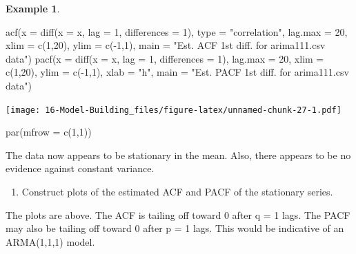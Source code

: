 \documentclass[
]{book}
\newenvironment{Shaded}{\begin{snugshade}}{\end{snugshade}}
\newcommand{\AttributeTok}[1]{\textcolor[rgb]{0.77,0.63,0.00}{#1}}
\newcommand{\DecValTok}[1]{\textcolor[rgb]{0.00,0.00,0.81}{#1}}
\newcommand{\FunctionTok}[1]{\textcolor[rgb]{0.00,0.00,0.00}{#1}}
\newcommand{\NormalTok}[1]{#1}
\newcommand{\OtherTok}[1]{\textcolor[rgb]{0.56,0.35,0.01}{#1}}
\newcommand{\SpecialCharTok}[1]{\textcolor[rgb]{0.00,0.00,0.00}{#1}}
\newcommand{\StringTok}[1]{\textcolor[rgb]{0.31,0.60,0.02}{#1}}
\providecommand{\tightlist}{%
  \setlength{\itemsep}{0pt}\setlength{\parskip}{0pt}}
\theoremstyle{definition}
\theoremstyle{definition}
\newtheorem{example}{Example}[chapter]
\theoremstyle{definition}
\theoremstyle{definition}
\theoremstyle{remark}
\begin{document}
\begin{example}
\begin{Shaded}
\begin{Highlighting}[]
\FunctionTok{acf}\NormalTok{(}\AttributeTok{x =} \FunctionTok{diff}\NormalTok{(}\AttributeTok{x =}\NormalTok{ x, }\AttributeTok{lag =} \DecValTok{1}\NormalTok{, }\AttributeTok{differences =} \DecValTok{1}\NormalTok{), }\AttributeTok{type =} 
    \StringTok{"correlation"}\NormalTok{, }\AttributeTok{lag.max =} \DecValTok{20}\NormalTok{, }\AttributeTok{xlim =} \FunctionTok{c}\NormalTok{(}\DecValTok{1}\NormalTok{,}\DecValTok{20}\NormalTok{), }\AttributeTok{ylim =} 
    \FunctionTok{c}\NormalTok{(}\SpecialCharTok{{-}}\DecValTok{1}\NormalTok{,}\DecValTok{1}\NormalTok{), }\AttributeTok{main =} \StringTok{"Est. ACF 1st diff. for arima111.csv }
\StringTok{    data"}\NormalTok{)}
\FunctionTok{pacf}\NormalTok{(}\AttributeTok{x =} \FunctionTok{diff}\NormalTok{(}\AttributeTok{x =}\NormalTok{ x, }\AttributeTok{lag =} \DecValTok{1}\NormalTok{, }\AttributeTok{differences =} \DecValTok{1}\NormalTok{), lag.max }
    \OtherTok{=} \DecValTok{20}\NormalTok{, }\AttributeTok{xlim =} \FunctionTok{c}\NormalTok{(}\DecValTok{1}\NormalTok{,}\DecValTok{20}\NormalTok{), }\AttributeTok{ylim =} \FunctionTok{c}\NormalTok{(}\SpecialCharTok{{-}}\DecValTok{1}\NormalTok{,}\DecValTok{1}\NormalTok{), }\AttributeTok{xlab =} \StringTok{"h"}\NormalTok{,  }
    \AttributeTok{main =} \StringTok{"Est. PACF 1st diff. for arima111.csv data"}\NormalTok{)}
\end{Highlighting}
\end{Shaded}

\texttt{[image: 16-Model-Building\_files/figure-latex/unnamed-chunk-27-1.pdf]}

\begin{Shaded}
\begin{Highlighting}[]
\FunctionTok{par}\NormalTok{(}\AttributeTok{mfrow =} \FunctionTok{c}\NormalTok{(}\DecValTok{1}\NormalTok{,}\DecValTok{1}\NormalTok{))}
\end{Highlighting}
\end{Shaded}

The data now appears to be stationary in the mean. Also, there appears to be no evidence against constant variance.

\begin{enumerate}
\def\labelenumi{\arabic{enumi}.}
\setcounter{enumi}{1}
\tightlist
\item
  Construct plots of the estimated ACF and PACF of the stationary series.
\end{enumerate}

The plots are above. The ACF is tailing off toward 0 after q = 1 lags. The PACF may also be tailing off toward 0 after p = 1 lags. This would be indicative of an ARMA(1,1,1) model.


\end{example}
\end{document}
